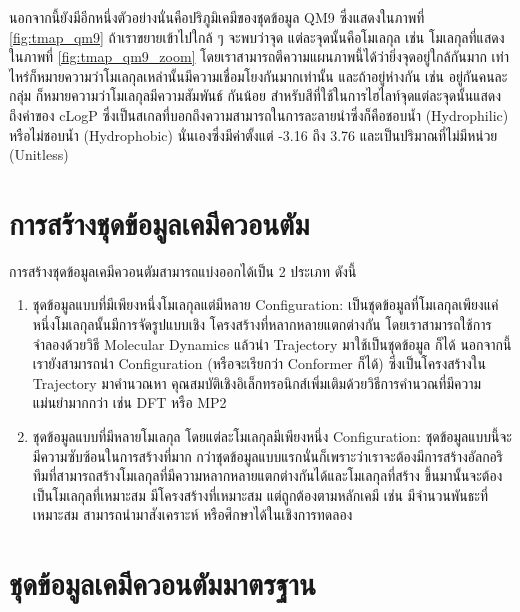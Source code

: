 นอกจากนี้ยังมีอีกหนึ่งตัวอย่างนั่นคือปริภูมิเคมีของชุดข้อมูล QM9 ซึ่งแสดงในภาพที่ \ref{fig:tmap_qm9} ถ้าเราขยายเข้าไปใกล้ ๆ จะพบว่าจุด%
แต่ละจุดนั้นคือโมเลกุล เช่น โมเลกุลที่แสดงในภาพที่ \ref{fig:tmap_qm9_zoom} โดยเราสามารถตีความแผนภาพนี้ได้ว่ายิ่งจุดอยู่ใกล้กันมาก%
เท่าไหร่ก็หมายความว่าโมเลกุลเหล่านั้นมีความเชื่อมโยงกันมากเท่านั้น และถ้าอยู่ห่างกัน เช่น อยู่กันคนละกลุ่ม ก็หมายความว่าโมเลกุลมีความสัมพันธ์%
กันน้อย สำหรับสีที่ใช้ในการไฮไลท์จุดแต่ละจุดนั้นแสดงถึงค่าของ cLogP ซึ่งเป็นสเกลที่บอกถึงความสามารถในการละลายนำซึ่งก็คือชอบน้ำ 
(Hydrophilic) หรือไม่ชอบน้ำ (Hydrophobic) นั่นเองซึ่งมีค่าตั้งแต่ -3.16 ถึง 3.76 และเป็นปริมาณที่ไม่มีหน่วย (Unitless)

\section{การสร้างชุดข้อมูลเคมีควอนตัม}
\label{ssec:step_create_qm_dataset}

การสร้างชุดข้อมูลเคมีควอนตัมสามารถแบ่งออกได้เป็น 2 ประเภท ดังนี้

\begin{enumerate}[topsep=0pt]
    \item ชุดข้อมูลแบบที่มีเพียงหนึ่งโมเลกุลแต่มีหลาย Configuration: เป็นชุดข้อมูลที่โมเลกุลเพียงแค่หนึ่งโมเลกุลนั้นมีการจัดรูปแบบเชิง%
    โครงสร้างที่หลากหลายแตกต่างกัน โดยเราสามารถใช้การจำลองด้วยวิธี Molecular Dynamics แล้วนำ Trajectory มาใช้เป็นชุดข้อมูล%
    ก็ได้ นอกจากนี้เรายังสามารถนำ Configuration (หรือจะเรียกว่า Conformer ก็ได้) ซึ่งเป็นโครงสร้างใน Trajectory มาคำนวณหา%
    คุณสมบัติเชิงอิเล็กทรอนิกส์เพิ่มเติมด้วยวิธีการคำนวณที่มีความแม่นยำมากกว่า เช่น DFT หรือ MP2

    \item ชุดข้อมูลแบบที่มีหลายโมเลกุล โดยแต่ละโมเลกุลมีเพียงหนึ่ง Configuration: ชุดข้อมูลแบบนี้จะมีความซับซ้อนในการสร้างที่มาก%
    กว่าชุดข้อมูลแบบแรกนั่นก็เพราะว่าเราจะต้องมีการสร้างอัลกอริทึมที่สามารถสร้างโมเลกุลที่มีความหลากหลายแตกต่างกันได้และโมเลกุลที่สร้าง%
    ขึ้นมานั้นจะต้องเป็นโมเลกุลที่เหมาะสม มีโครงสร้างที่เหมาะสม แต่ถูกต้องตามหลักเคมี เช่น มีจำนวนพันธะที่เหมาะสม สามารถนำมาสังเคราะห์%
    หรือศึกษาได้ในเชิงการทดลอง
\end{enumerate}

\section{ชุดข้อมูลเคมีควอนตัมมาตรฐาน}
\label{sec:std_dataset}

